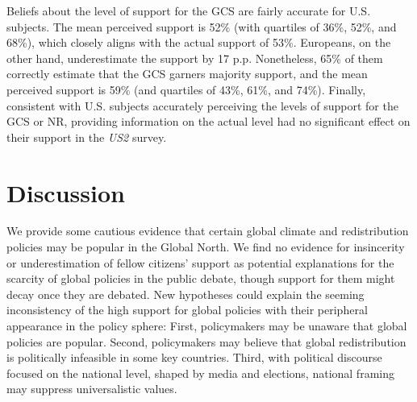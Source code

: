 Beliefs about the level of support for the GCS are fairly accurate for U.S. subjects. The mean perceived support is 52\% (with quartiles of 36\%, 52\%, and 68\%), which closely aligns with the actual support of 53\%. Europeans, on the other hand, underestimate the support by 17 p.p. Nonetheless, 65\% of them correctly estimate that the GCS garners majority support, and the mean perceived support is 59\% (and quartiles of 43\%, 61\%, and 74\%). 
Finally, consistent with U.S. subjects accurately perceiving the levels of support for the GCS or NR, providing information on the actual level had no significant effect on their support in the \textit{US2} survey. %



\section*{Discussion} %

We provide some cautious evidence that certain global climate and redistribution policies may be popular in the Global North. We find no evidence for insincerity or underestimation of fellow citizens' support as potential explanations for the scarcity of global policies in the public debate, though support for them might decay once they are debated. New hypotheses could explain the seeming inconsistency of the high support for global policies with their peripheral appearance in the policy sphere: First, policymakers may be unaware that global policies are popular. Second, policymakers may believe that global redistribution is politically infeasible in some key countries. Third, with political discourse focused on the national level, shaped by media and elections, national framing may suppress universalistic values. 

